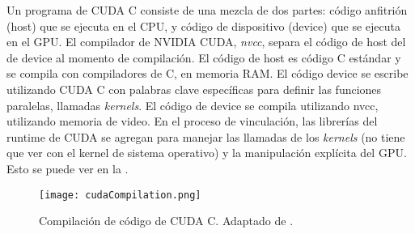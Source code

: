 Un programa de CUDA C consiste de una mezcla de dos partes: código anfitrión (host) que se ejecuta en el CPU, y código de dispositivo (device) que se ejecuta en el GPU. El compilador de NVIDIA CUDA, \textit{nvcc}, separa el código de host del de device al momento de compilación. El código de host es código C estándar y se compila con compiladores de C, en memoria RAM. El código device se escribe utilizando CUDA C con palabras clave específicas para definir las funciones paralelas, llamadas \textit{kernels}. El código de device se compila utilizando nvcc, utilizando memoria de video. En el proceso de vinculación, las librerías del runtime de CUDA se agregan para manejar las llamadas de los \textit{kernels} (no tiene que ver con el kernel de sistema operativo) y la manipulación explícita del GPU. Esto se puede ver en la .

\begin{figure}
	\centering
		\texttt{[image: cudaCompilation.png]}
	\caption[Compilación de código de CUDA C.]{Compilación de código de CUDA C. Adaptado de \citep{cuda2014cheng}.}
		\label{fig:cudaCompilation}
\end{figure}











